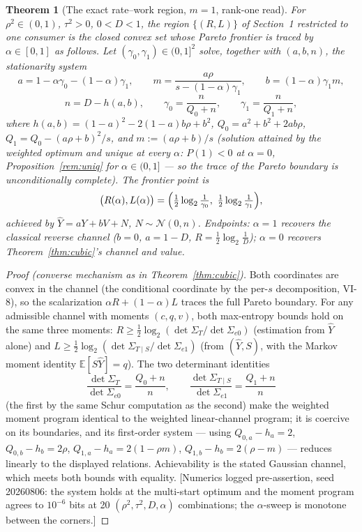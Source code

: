 \documentclass[11pt]{article}
\newtheorem{theorem}{Theorem}\newtheorem{corollary}{Corollary}
\newcommand{\E}{\mathbb{E}}\newcommand{\tr}{\operatorname{tr}}
\newcommand{\hY}{\widehat Y}
\begin{document}
\begin{theorem}[The exact rate--work region, $m=1$, rank-one read]
\label{thm:frontier}
For $\rho^2\in(0,1)$, $\tau^2>0$, $0<D<1$, the region
$\{(R,L)\}$ of Section~1 restricted to one consumer is the closed convex
set whose Pareto frontier is traced by $\alpha\in[0,1]$ as follows. Let
$(\gamma_0,\gamma_1)\in(0,1]^2$ solve, together with
$(a,b,n)$, the stationarity system
\[
a=1-\alpha\gamma_0-(1-\alpha)\gamma_1,\qquad
m=\frac{a\rho}{s-(1-\alpha)\gamma_1},\qquad
b=(1-\alpha)\gamma_1 m,
\]
\[
n=D-h(a,b),\qquad
\gamma_0=\frac{n}{Q_0+n},\qquad
\gamma_1=\frac{n}{Q_1+n},
\]
where $h(a,b)=(1-a)^2-2(1-a)b\rho+b^2$,
$Q_0=a^2+b^2+2ab\rho$, $Q_1=Q_0-(a\rho+b)^2/s$, and $m:=(a\rho+b)/s$
(solution attained by the weighted optimum and \emph{unique at every}
$\alpha$: $P(1)<0$ at $\alpha=0$, Proposition~\ref{rem:uniq} for
$\alpha\in(0,1]$ --- so the trace of the Pareto boundary is
unconditionally complete). The frontier point is
\[
\bigl(R(\alpha),L(\alpha)\bigr)
=\Bigl(\tfrac12\log_2\tfrac1{\gamma_0},\ \tfrac12\log_2\tfrac1{\gamma_1}\Bigr),
\]
achieved by $\hY=aY+bV+N$, $N\sim\mathcal N(0,n)$. Endpoints:
$\alpha=1$ recovers the classical reverse channel
($b=0$, $a=1-D$, $R=\tfrac12\log_2\tfrac1D$); $\alpha=0$ recovers
Theorem~\ref{thm:cubic}'s channel and value.
\end{theorem}
\begin{proof}[Proof (converse mechanism as in Theorem~\ref{thm:cubic})]
Both coordinates are convex in the channel (the conditional coordinate by
the per-$s$ decomposition, VI-8), so the scalarization
$\alpha R+(1-\alpha)L$ traces the full Pareto boundary. For any admissible
channel with moments $(c,q,v)$, both max-entropy bounds hold on the same
three moments:
$R\ge\tfrac12\log_2(\det\Sigma_T/\det\Sigma_{e0})$ (estimation from $\hY$
alone) and $L\ge\tfrac12\log_2(\det\Sigma_{T\mid S}/\det\Sigma_{e1})$
(from $(\hY,S)$, with the Markov moment identity $\E[S\hY]=q$). The two
determinant identities
\[
\frac{\det\Sigma_T}{\det\Sigma_{e0}}=\frac{Q_0+n}{n},
\qquad
\frac{\det\Sigma_{T\mid S}}{\det\Sigma_{e1}}=\frac{Q_1+n}{n}
\]
(the first by the same Schur computation as the second) make the weighted
moment program identical to the weighted linear-channel program; it is
coercive on its boundaries, and its first-order system --- using
$Q_{0,a}-h_a=2$, $Q_{0,b}-h_b=2\rho$, $Q_{1,a}-h_a=2(1-\rho m)$,
$Q_{1,b}-h_b=2(\rho-m)$ --- reduces linearly to the displayed relations.
Achievability is the stated Gaussian channel, which meets both bounds with
equality. [Numerics logged pre-assertion, seed 20260806: the system holds
at the multi-start optimum and the moment program agrees to $10^{-6}$
bits at 20 $(\rho^2,\tau^2,D,\alpha)$ combinations; the $\alpha$-sweep is
monotone between the corners.]
\end{proof}
\end{document}
